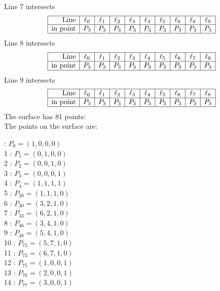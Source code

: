 \documentclass{article}
\begin{document}
{$$$$
Line 7 intersects 
$$
\begin{array}{|r*{9}{|c}|}
\hline
\mbox{Line}  & \ell_{0} & \ell_{1} & \ell_{2} & \ell_{3} & \ell_{4} & \ell_{5} & \ell_{6} & \ell_{8} & \ell_{9}\\
\hline
\mbox{in point}  & P_{3} & P_{3} & P_{3} & P_{3} & P_{3} & P_{3} & P_{3} & P_{3} & P_{3}\\
\hline
\end{array}
$$
Line 8 intersects 
$$
\begin{array}{|r*{9}{|c}|}
\hline
\mbox{Line}  & \ell_{0} & \ell_{1} & \ell_{2} & \ell_{3} & \ell_{4} & \ell_{5} & \ell_{6} & \ell_{7} & \ell_{9}\\
\hline
\mbox{in point}  & P_{3} & P_{3} & P_{3} & P_{3} & P_{3} & P_{3} & P_{3} & P_{3} & P_{3}\\
\hline
\end{array}
$$
Line 9 intersects 
$$
\begin{array}{|r*{9}{|c}|}
\hline
\mbox{Line}  & \ell_{0} & \ell_{1} & \ell_{2} & \ell_{3} & \ell_{4} & \ell_{5} & \ell_{6} & \ell_{7} & \ell_{8}\\
\hline
\mbox{in point}  & P_{3} & P_{3} & P_{3} & P_{3} & P_{3} & P_{3} & P_{3} & P_{3} & P_{3}\\
\hline
\end{array}
$$
The surface has 81 points:\\
The points on the surface are:\\
\begin{multicols}{3}
 : $P_{0}=( 1, 0, 0, 0 )$\\
1 : $P_{1}=( 0, 1, 0, 0 )$\\
2 : $P_{2}=( 0, 0, 1, 0 )$\\
3 : $P_{3}=( 0, 0, 0, 1 )$\\
4 : $P_{4}=( 1, 1, 1, 1 )$\\
5 : $P_{20}=( 1, 1, 1, 0 )$\\
6 : $P_{30}=( 3, 2, 1, 0 )$\\
7 : $P_{33}=( 6, 2, 1, 0 )$\\
8 : $P_{46}=( 3, 4, 1, 0 )$\\
9 : $P_{48}=( 5, 4, 1, 0 )$\\
10 : $P_{72}=( 5, 7, 1, 0 )$\\
11 : $P_{73}=( 6, 7, 1, 0 )$\\
12 : $P_{75}=( 1, 0, 0, 1 )$\\
13 : $P_{76}=( 2, 0, 0, 1 )$\\
14 : $P_{77}=( 3, 0, 0, 1 )$\\

\end{multicols}}
\end{document}
